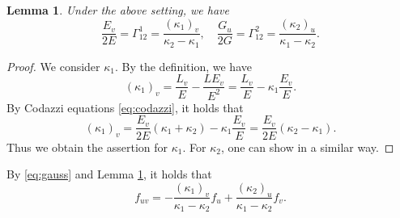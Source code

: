 \documentclass[11pt,a4paper,pdflatex,final]{amsart}
\theoremstyle{plain}
\newtheorem{lemma}[theorem]{Lemma}%
\theoremstyle{definition}
\newtheorem{definition}[theorem]{Definition}%
\theoremstyle{remark}
\newcommand{\0}{\bm{0}}
\newcommand{\R}{\mathbb{R}}
\newcommand{\be}{\bm{e}}
\numberwithin{equation}{section}
\begin{document}
\begin{lemma}\label{lem:d-kappa}
Under the above setting, we have 
\[
\frac{E_v}{2E}=\Gamma^{1}_{12}=\frac{(\kappa_1)_{v}}{\kappa_2-\kappa_1},\quad 
\frac{G_u}{2G}=\Gamma^{2}_{12}=\frac{(\kappa_2)_{u}}{\kappa_1-\kappa_2}.
\]
\end{lemma}
\begin{proof}
We consider $\kappa_1$. 
By the definition, we have 
\[
(\kappa_1)_{v}
=\frac{L_v}{E}-\frac{LE_v}{E^2}
=\frac{L_v}{E}-\kappa_1\frac{E_v}{E}.
\]
By Codazzi equations \eqref{eq:codazzi}, it holds that 
\[
(\kappa_1)_{v}
=\frac{E_v}{2E}(\kappa_1+\kappa_2)-\kappa_1\frac{E_v}{E}
=\frac{E_v}{2E}(\kappa_2-\kappa_1).
\]
Thus we obtain the assertion for $\kappa_1$. 
For $\kappa_2$, one can show in a similar way. 
\end{proof}
By \eqref{eq:gauss} and Lemma \ref{lem:d-kappa}, 
it holds that 
\[
f_{uv}=-\frac{(\kappa_1)_{v}}{\kappa_1-\kappa_2}f_u+\frac{(\kappa_2)_{u}}{\kappa_1-\kappa_2}f_v. 
\] 
%
\end{document}
